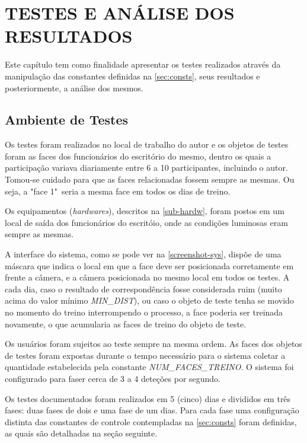 
\chapter{TESTES E ANÁLISE DOS RESULTADOS}\label{ch:resultados}

Este capítulo tem como finalidade apresentar os testes realizados através da manipulação das constantes definidas na \autoref{sec:consts}, seus resultados e posteriormente, a análise dos mesmos.

\section{Ambiente de Testes}\label{sec:ambtest}

Os testes foram realizados no local de trabalho do autor e os objetos de testes foram as faces dos funcionários do escritório do mesmo, dentro os quais a participação variava diariamente entre 6 a 10 participantes, incluindo o autor. Tomou-se cuidado para que as faces relacionadas fossem sempre as mesmas. Ou seja, a "face 1"\ seria a mesma face em todos os dias de treino.

Os equipamentos (\textit{hardwares}), descritos na \autoref{sub-hardw}, foram postos em um local de saída dos funcionários do escritóio, onde as condições luminosas eram sempre as mesmas.

A interface do sistema, como se pode ver na \autoref{screenshot-sys}, dispõe de uma máscara que indica o local em que a face deve ser posicionada corretamente em frente a câmera, e a câmera posicionada no mesmo local em todos os testes. A cada dia, caso o resultado de correspondência fosse considerada ruim (muito acima do valor mínimo \textit{MIN\_DIST}), ou caso o objeto de teste tenha se movido no momento do treino interrompendo o processo, a face poderia ser treinada novamente, o que acumularia as faces de treino do objeto de teste.



Os usuários foram sujeitos ao teste sempre na mesma ordem. As faces dos objetos de testes foram expostas durante o tempo necessário para o sistema coletar a quantidade estabelecida pela constante \textit{NUM\_FACES\_TREINO}. O sistema foi configurado para faser cerca de 3 a 4 deteções por segundo.

Os testes documentados foram realizados em 5 (cinco) dias e divididos em três fases: duas fases de dois e uma fase de um dias. Para cada fase uma configuração distinta das constantes de controle contempladas na \autoref{sec:consts} foram definidas, as quais são detalhadas na seção seguinte.

